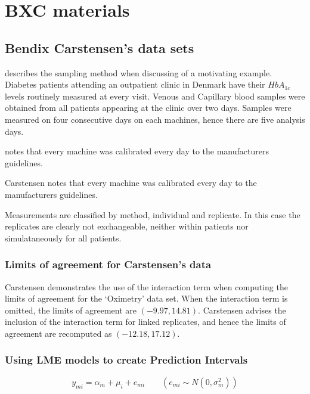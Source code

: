\documentclass[12pt, a4paper]{report}
\theoremstyle{plain}
\theoremstyle{definition}
\theoremstyle{remark}
\begin{document}
	\chapter{BXC materials}
	
	
	
	\section{Bendix Carstensen's data sets}
	\citet{BXC2008} describes the sampling method when discussing of a motivating example. Diabetes patients attending an outpatient clinic in Denmark have their $HbA_{1c}$ levels routinely measured at every visit. Venous and Capillary blood samples were obtained from all patients appearing at the clinic over two days. Samples were measured on four consecutive days on each machines, hence there are five analysis days.
	
	\citet{BXC2008} notes that every machine was calibrated every day to  the manufacturers guidelines.
	
	Carstensen notes that every machine was calibrated every day to  the manufacturers guidelines.
	
	Measurements are classified by method, individual and replicate. In this case the replicates are clearly not exchangeable, neither within patients nor simulataneously for all patients.
	
	
	\subsection{Limits of agreement for Carstensen's data}
	
	
	Carstensen demonstrates the use of the interaction term when computing the limits of agreement for the `Oximetry' data set. When the interaction term is omitted, the limits of agreement are $(-9.97, 14.81)$. Carstensen advises the inclusion of the interaction term for linked replicates, and hence the limits of agreement are recomputed as $(-12.18,17.12)$.
	
	
	\subsection{Using LME models to create Prediction Intervals}
	
	
	
	\begin{equation}
	y_{mi}  = \alpha_{m} + \mu_{i} + e_{mi} \qquad ( e_{mi} \sim
	N(0,\sigma^{2}_{m}))
	\end{equation}
	
\end{document}
